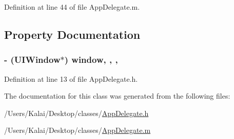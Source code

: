 Definition at line 44 of file App\-Delegate.\-m.



\subsection{Property Documentation}
\hypertarget{interface_app_delegate_acf48ac24125e688cac1a85445cd7fac2}{
\subsubsection[{window}]{\setlength{\rightskip}{0pt plus 5cm}-\/ (U\-I\-Window$\ast$) window\hspace{0.3cm}{\ttfamily [read]}, {\ttfamily [write]}, {\ttfamily [nonatomic]}, {\ttfamily [strong]}}}\label{interface_app_delegate_acf48ac24125e688cac1a85445cd7fac2}


Definition at line 13 of file App\-Delegate.\-h.



The documentation for this class was generated from the following files\-:\begin{DoxyCompactItemize}
\item 
/\-Users/\-Kalai/\-Desktop/classes/\hyperlink{_app_delegate_8h}{App\-Delegate.\-h}\item 
/\-Users/\-Kalai/\-Desktop/classes/\hyperlink{_app_delegate_8m}{App\-Delegate.\-m}\end{DoxyCompactItemize}
